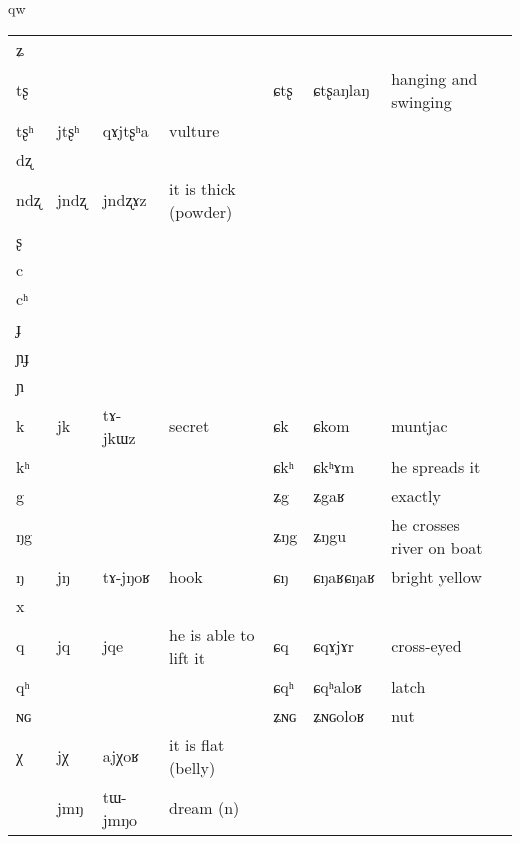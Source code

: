 qw\documentclass[oldfontcommands,oneside,a4paper,11pt]{article}
\newcommand{\ipa}[1]{{\phon #1}} %
\newcommand{\idph}[1]{\cellcolor{gray}\textbf{#1}}
\begin{document}
\begin{table}
{\begin{tabular}{l|lll|lll|l}
\ipa{ʑ}  & 	  & 	  & 	  & 	  & 	  & 	  & 	\\
\ipa{tʂ}  & 	  & 	  & 	  & 	 \ipa{ɕtʂ} \idph{}  & 	 \ipa{ɕtʂaŋlaŋ}  & 	 hanging and swinging & 	\\
\ipa{tʂʰ}  & 	 \ipa{jtʂʰ}  & 	 \ipa{qɤjtʂʰa}  & 	vulture  & 	  & 	  & 	  & 	\\
\ipa{dʐ}  & 	  & 	  & 	  & 	  & 	  & 	  & 	\\
\ipa{ndʐ}  & 	 \ipa{jndʐ}  & 	 \ipa{jndʐɤz}  & 	it is thick (powder)  & 	  & 	  & 	  & 	\\
\ipa{ʂ}  & 	  & 	  & 	  & 	  & 	  & 	  & 	\\
\ipa{c}  & 	  & 	  & 	  & 	  & 	  & 	  & 	\\
\ipa{cʰ}  & 	  & 	  & 	  & 	  & 	  & 	  & 	\\
\ipa{ɟ}  & 	  & 	  & 	  & 	  & 	  & 	  & 	\\
\ipa{ɲɟ}  & 	  & 	  & 	  & 	  & 	  & 	  & 	\\
\ipa{ɲ}  & 	  & 	  & 	  & 	  & 	  & 	  & 	\\
\ipa{k}  &	 \ipa{jk}  &	 \ipa{tɤ-jkɯz}  &	 secret  &	 \ipa{ɕk}  &	 \ipa{ɕkom}  &	 muntjac  &	\\	
\ipa{kʰ}  &	  &	  &	  &	 \ipa{ɕkʰ}  &	 \ipa{ɕkʰɤm}  &	 he spreads it  &	\\	
\ipa{g}  &	  &	  &	  &	 \ipa{ʑg}  &	 \ipa{ʑgaʁ}  &	 exactly  &	\\	
\ipa{ŋg}  &	  &	  &	  &	 \ipa{ʑŋg}  &	 \ipa{ʑŋgu}  &	 he crosses river on boat  &	\\	
\ipa{ŋ}  &	 \ipa{jŋ}  &	 \ipa{tɤ-jŋoʁ}  &	 hook  &	 \ipa{ɕŋ} \idph{}  &	 \ipa{ɕŋaʁɕŋaʁ}  &	 bright yellow  &	\\	
\ipa{x}  &	  &	  &	  &	  &	  &	  &	\\	
\ipa{q}  &	 \ipa{jq}  &	 \ipa{jqe}  &	 he is able to lift it  &	 \ipa{ɕq}  &	 \ipa{ɕqɤjɤr}  &	 cross-eyed  &	\\	
\ipa{qʰ}  &	  &	  &	  &	 \ipa{ɕqʰ}  &	 \ipa{ɕqʰaloʁ}  &	 latch  &	\\	
\ipa{ɴɢ}  &	  &	  &	  &	 \ipa{ʑɴɢ}  &	 \ipa{ʑɴɢoloʁ}  &	 nut  &	\\	
\ipa{χ}  &	 \ipa{jχ}  &	 \ipa{ajχoʁ}  &	 it is flat (belly)  &	  &	  &	  &	\\	
\midrule  					 
 &\ipa{jmŋ} & \ipa{tɯ-jmŋo} &dream (n) \\  
  \end{tabular}}
\end{table}
  
\end{document}
